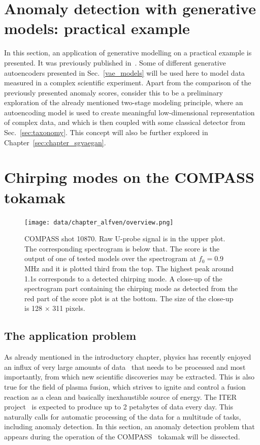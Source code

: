 \section{Anomaly detection with generative models: practical example} \label{sec:alfven}
In this section, an application of generative modelling on a practical example is presented. It was previously published in~\cite{vskvara2020detection}. Some of different generative autoencoders presented in Sec.~\ref{vae_models} will be used here to model data measured in a complex scientific experiment. Apart from the comparison of the previously presented anomaly scores, consider this to be a preliminary exploration of the already mentioned two-stage modeling principle, where an autoencoding model is used to create meaningful low-dimensional representation of complex data, and which is then coupled with some classical detector from Sec.~\ref{sec:taxonomy}. This concept will also be further explored in Chapter~\ref{sec:chapter_sgvaegan}.

\section{Chirping modes on the COMPASS tokamak}
\begin{figure}[t]%
  \centering
  \texttt{[image: data/chapter\_alfven/overview.png]}
  \caption{COMPASS shot 10870. Raw U-probe signal is in the upper plot. The corresponding spectrogram is below that. The score is the output of one of tested models over the spectrogram at $f_0=0.9$ MHz and it is plotted third from the top. The highest peak around 1.1s corresponds to a detected chirping mode. A close-up of the spectrogram part containing the chirping mode as detected from the red part of the score plot is at the bottom. The size of the close-up is 128 $\times$ 311 pixels.}
  \label{fig:psd}
\end{figure}

\subsection{The application problem}
As already mentioned in the introductory chapter, physics has recently enjoyed an influx of very large amounts of data~\cite{bird2011computing,ball2010data} that needs to be processed and most importantly, from which new scientific discoveries may be extracted. This is also true for the field of plasma fusion, which strives to ignite and control a fusion reaction as a clean and basically inexhaustible source of energy. The ITER project~\cite{holtkamp2007overview} is expected to produce up to 2 petabytes of data every day. This naturally calls for automatic processing of the data for a multitude of tasks, including anomaly detection. In this section, an anomaly detection problem that appears during the operation of the COMPASS~\cite{panek2015status} tokamak will be dissected.

